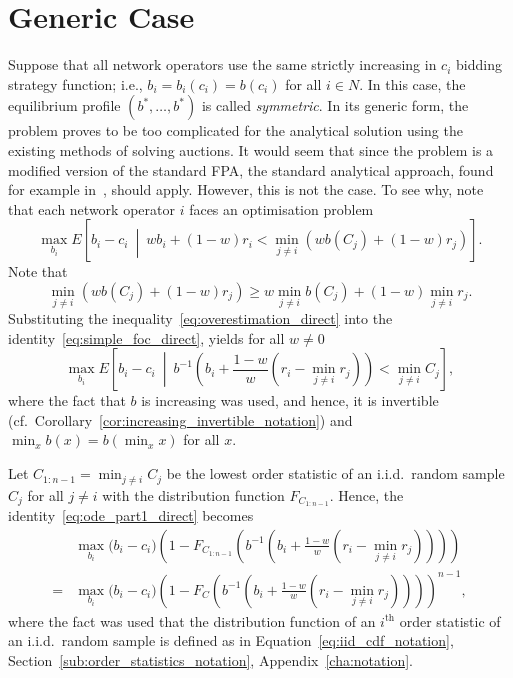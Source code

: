 \section{Generic Case} %
\label{sec:direct_generic_case_direct}
Suppose that all network operators use the same strictly increasing in $c_i$ bidding strategy function; i.e., $b_i = b_i(c_i) = b(c_i)$ for all $i\in N$. In this case, the equilibrium profile $(b^*,\ldots,b^*)$ is called \emph{symmetric}. In its generic form, the problem proves to be too complicated for the analytical solution using the existing methods of solving auctions. It would seem that since the problem is a modified version of the standard FPA, the standard analytical approach, found for example in~\cite{Krishna10,McAfee1987,Hansen88,Dastidar08}, should apply. However, this is not the case. To see why, note that each network operator $i$ faces an optimisation problem
\begin{equation}
	\label{eq:simple_foc_direct}
	\max_{b_i}E\left[ b_i-c_i \:\middle\vert\: wb_i + (1-w)r_i < \displaystyle\min_{j\neq i}(wb(C_j) + (1-w)r_j) \right].
\end{equation}
Note that
\begin{equation}
	\label{eq:overestimation_direct}
	\displaystyle\min_{j\neq i}(wb(C_j) + (1-w)r_j) \ge w\displaystyle\min_{j\neq i}b(C_j) + (1-w)\displaystyle\min_{j\neq i}r_j.
\end{equation}
Substituting the inequality~\eqref{eq:overestimation_direct} into the identity~\eqref{eq:simple_foc_direct}, yields for all $w\neq 0$
\begin{equation}
	\max_{b_i}E\left[ b_i-c_i \:\middle\vert\: b^{-1}\left(b_i + \frac{1-w}{w}(r_i-\displaystyle\min_{j\neq i}r_j)\right) < \displaystyle\min_{j\neq i}C_j \right],
	\label{eq:ode_part1_direct}
\end{equation}
where the fact that $b$ is increasing was used, and hence, it is invertible (cf.~Corollary~\ref{cor:increasing_invertible_notation}) and $\min_{x}b(x) = b(\min_{x}x)$ for all $x$.

Let $C_{1:n-1} = \min_{j\neq i}C_j$ be the lowest order statistic of an i.i.d.~random sample $C_j$ for all $j\neq i$ with the distribution function $F_{C_{1:n-1}}$. Hence, the identity~\eqref{eq:ode_part1_direct} becomes
\begin{align}
	&\max_{b_i}\bigg(b_i-c_i\bigg)\left(1 - F_{C_{1:n-1}}\left(b^{-1}\left(b_i + \frac{1-w}{w}(r_i-\min_{j\neq i}r_j)\right)\right)\right) \nonumber\\
	= &\max_{b_i}\bigg(b_i-c_i\bigg)\left(1 - F_{C}\left(b^{-1}\left(b_i + \frac{1-w}{w}(r_i-\min_{j\neq i}r_j)\right)\right)\right)^{n-1},
	\label{eq:ode_part2_direct}
\end{align}
where the fact was used that the distribution function of an $i^\textrm{th}$ order statistic of an i.i.d.~random sample is defined as in Equation~\eqref{eq:iid_cdf_notation}, Section~\ref{sub:order_statistics_notation}, Appendix~\ref{cha:notation}.

